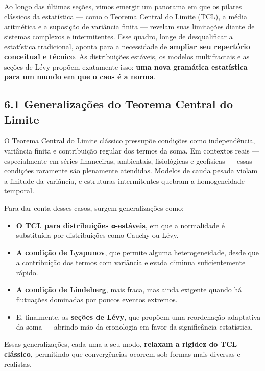 \documentclass[
]{agujournal2019}
\providecommand{\tightlist}{%
  \setlength{\itemsep}{0pt}\setlength{\parskip}{0pt}}\usepackage{longtable,booktabs,array}
\begin{document}
Ao longo das últimas seções, vimos emergir um panorama em que os pilares
clássicos da estatística --- como o Teorema Central do Limite (TCL), a
média aritmética e a suposição de variância finita --- revelam suas
limitações diante de sistemas complexos e intermitentes. Esse quadro,
longe de desqualificar a estatística tradicional, aponta para a
necessidade de \textbf{ampliar seu repertório conceitual e técnico}. As
distribuições estáveis, os modelos multifractais e as seções de Lévy
propõem exatamente isso: \textbf{uma nova gramática estatística para um
mundo em que o caos é a norma}.

\subsection{6.1 Generalizações do Teorema Central do
Limite}\label{generalizauxe7uxf5es-do-teorema-central-do-limite}

O Teorema Central do Limite clássico pressupõe condições como
independência, variância finita e contribuição regular dos termos da
soma. Em contextos reais --- especialmente em séries financeiras,
ambientais, fisiológicas e geofísicas --- essas condições raramente são
plenamente atendidas. Modelos de cauda pesada violam a finitude da
variância, e estruturas intermitentes quebram a homogeneidade temporal.

Para dar conta desses casos, surgem generalizações como:

\begin{itemize}
\tightlist
\item
  \textbf{O TCL para distribuições α-estáveis}, em que a normalidade é
  substituída por distribuições como Cauchy ou Lévy.
\item
  \textbf{A condição de Lyapunov}, que permite alguma heterogeneidade,
  desde que a contribuição dos termos com variância elevada diminua
  suficientemente rápido.
\item
  \textbf{A condição de Lindeberg}, mais fraca, mas ainda exigente
  quando há flutuações dominadas por poucos eventos extremos.
\item
  E, finalmente, as \textbf{seções de Lévy}, que propõem uma reordenação
  adaptativa da soma --- abrindo mão da cronologia em favor da
  significância estatística.
\end{itemize}

Essas generalizações, cada uma a seu modo, \textbf{relaxam a rigidez do
TCL clássico}, permitindo que convergências ocorrem sob formas mais
diversas e realistas.
\end{document}
